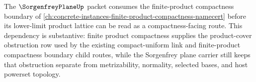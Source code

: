 The $\SorgenfreyPlaneUp$ packet consumes the finite-product compactness boundary of \autoref{ch:concrete-instances-finite-product-compactness-namecert} before its lower-limit product lattice can be read as a compactness-facing route. This dependency is substantive: finite product compactness supplies the product-cover obstruction row used by the existing compact-uniform link and finite-product compactness boundary child routes, while the Sorgenfrey plane carrier still keeps that obstruction separate from metrizability, normality, selected bases, and host powerset topology.
